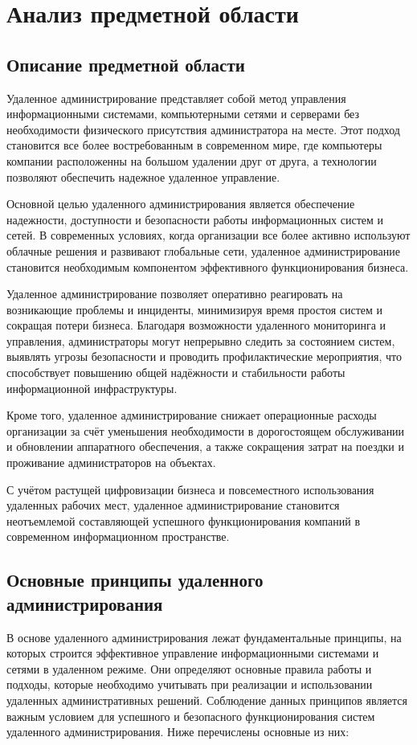 \newsection
\section{Анализ предметной области}
\subsection{Описание предметной области}
Удаленное администрирование представляет собой метод управления информационными системами, компьютерными сетями и серверами без необходимости физического присутствия администратора на месте. Этот подход становится все более востребованным в современном мире, где компьютеры компании расположенны на большом удалении друг от друга, а технологии позволяют обеспечить надежное удаленное управление.

Основной целью удаленного администрирования является обеспечение надежности, доступности и безопасности работы информационных систем и сетей. В современных условиях, когда организации все более активно используют облачные решения и развивают глобальные сети, удаленное администрирование становится необходимым компонентом эффективного функционирования бизнеса.

Удаленное администрирование позволяет оперативно реагировать на возникающие проблемы и инциденты, минимизируя время простоя систем и сокращая потери бизнеса. Благодаря возможности удаленного мониторинга и управления, администраторы могут непрерывно следить за состоянием систем, выявлять угрозы безопасности и проводить профилактические мероприятия, что способствует повышению общей надёжности и стабильности работы информационной инфраструктуры.

Кроме того, удаленное администрирование снижает операционные расходы организации за счёт уменьшения необходимости в дорогостоящем обслуживании и обновлении аппаратного обеспечения, а также сокращения затрат на поездки и проживание администраторов на объектах.

С учётом растущей цифровизации бизнеса и повсеместного использования удаленных рабочих мест, удаленное администрирование становится неотъемлемой составляющей успешного функционирования компаний в современном информационном пространстве.

\subsection{Основные принципы удаленного администрирования}

В основе удаленного администрирования лежат фундаментальные принципы, на которых строится эффективное управление информационными системами и сетями в удаленном режиме. Они определяют основные правила работы и подходы, которые необходимо учитывать при реализации и использовании удаленных административных решений. Соблюдение данных принципов является важным условием для успешного и безопасного функционирования систем удаленного администрирования. Ниже перечислены основные из них:

